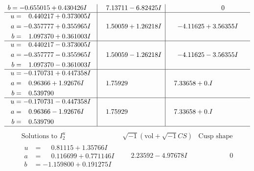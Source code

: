 \documentclass[1p]{elsarticle_modified}
\theoremstyle{definition}
\newcommand{\I}{\sqrt{-1}}
\begin{document}
$$\begin{array}{c|c|c}
\begin{aligned}
b &= -0.655015 + 0.430426 I\end{aligned}
 & \phantom{-}7.13711 - 6.82425 I & \phantom{-0.000000 } 0 \\ \hline\begin{aligned}
u &= \phantom{-}0.440217 + 0.373005 I \\
a &= -0.357777 + 0.355965 I \\
b &= \phantom{-}1.097370 + 0.361003 I\end{aligned}
 & \phantom{-}1.50059 + 1.26218 I & -4.11625 + 3.56355 I \\ \hline\begin{aligned}
u &= \phantom{-}0.440217 - 0.373005 I \\
a &= -0.357777 - 0.355965 I \\
b &= \phantom{-}1.097370 - 0.361003 I\end{aligned}
 & \phantom{-}1.50059 - 1.26218 I & -4.11625 - 3.56355 I \\ \hline\begin{aligned}
u &= -0.170731 + 0.447358 I \\
a &= \phantom{-}0.96366 + 1.92676 I \\
b &= \phantom{-}0.539790\phantom{ +0.000000I}\end{aligned}
 & \phantom{-}1.75929\phantom{ +0.000000I} & \phantom{-}7.33658 + 0. I\phantom{ +0.000000I} \\ \hline\begin{aligned}
u &= -0.170731 - 0.447358 I \\
a &= \phantom{-}0.96366 - 1.92676 I \\
b &= \phantom{-}0.539790\phantom{ +0.000000I}\end{aligned}
 & \phantom{-}1.75929\phantom{ +0.000000I} & \phantom{-}7.33658 + 0. I\phantom{ +0.000000I}\\
 \hline 
 \end{array}$$\newpage$$\begin{array}{c|c|c}  
\text{Solutions to }I^u_{2}& \I (\text{vol} + \sqrt{-1}CS) & \text{Cusp shape}\\
 \hline 
\begin{aligned}
u &= \phantom{-}0.81115 + 1.35766 I \\
a &= \phantom{-}0.116699 + 0.771146 I \\
b &= -1.159800 + 0.191275 I\end{aligned}
 & \phantom{-}2.23592 - 4.97678 I & \phantom{-0.000000 } 0 \\ \hline\begin{aligned}

\end{aligned}
\end{array}$$
\end{document}
